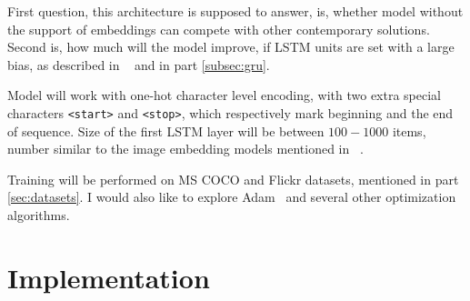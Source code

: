 First question, this architecture is supposed to answer, is, whether model without the support of embeddings can compete with other contemporary solutions. Second is, how much will the model improve, if LSTM units are set with a large bias, as described in ~\cite{DBLP:conf/icml/JozefowiczZS15} and in part \ref{subsec:gru}.

Model will work with one-hot character level encoding, with two extra special characters \texttt{<start>} and \texttt{<stop>}, which respectively mark beginning and the end of sequence. Size of the first LSTM layer will be between $ 100-1000 $ items, number similar to the image embedding models mentioned in ~\cite{DBLP:journals/corr/VinyalsTBE14, DBLP:journals/corr/FangGISDDGHMPZZ14}.

Training will be performed on MS COCO and Flickr datasets, mentioned in part \ref{sec:datasets}. I would also like to explore Adam~\cite{DBLP:journals/corr/KingmaB14} and several other optimization algorithms.

%
%
%
%

\chapter{Implementation}

